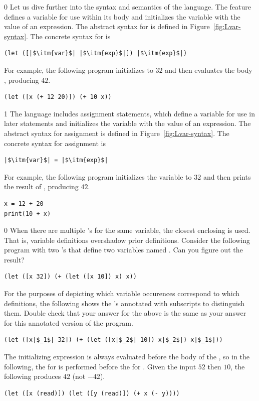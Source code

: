 \documentclass[7x10,nocrop]{TimesAPriori_MIT}%
\def\racketEd{0}
\def\pythonEd{1}
\def\edition{0}
\begin{document}
{\if\edition\racketEd
Let us dive further into the syntax and semantics of the \LangVar{}
language.  The  feature defines a variable for use within its
body and initializes the variable with the value of an expression.
The abstract syntax for  is defined in
Figure~\ref{fig:Lvar-syntax}.  The concrete syntax for  is
\begin{lstlisting}
(let ([|$\itm{var}$| |$\itm{exp}$|]) |$\itm{exp}$|)
\end{lstlisting}
For example, the following program initializes  to $32$ and then
evaluates the body , producing $42$.
\begin{lstlisting}
(let ([x (+ 12 20)]) (+ 10 x))
\end{lstlisting}
\fi}
%
{\if\edition\pythonEd
%
The \LangVar{} language includes assignment statements, which define a
variable for use in later statements and initializes the variable with
the value of an expression.  The abstract syntax for assignment is
defined in Figure~\ref{fig:Lvar-syntax}.  The concrete syntax for
assignment is
\begin{lstlisting}
|$\itm{var}$| = |$\itm{exp}$|
\end{lstlisting}
For example, the following program initializes the variable 
to $32$ and then prints the result of , producing $42$.
\begin{lstlisting}
x = 12 + 20
print(10 + x)
\end{lstlisting}
\fi}

{\if\edition\racketEd
%  
When there are multiple 's for the same variable, the closest
enclosing  is used. That is, variable definitions overshadow
prior definitions. Consider the following program with two 's
that define two variables named . Can you figure out the
result?
\begin{lstlisting}
(let ([x 32]) (+ (let ([x 10]) x) x))
\end{lstlisting}
For the purposes of depicting which variable occurences correspond to
which definitions, the following shows the 's annotated with
subscripts to distinguish them. Double check that your answer for the
above is the same as your answer for this annotated version of the
program.
\begin{lstlisting}
(let ([x|$_1$| 32]) (+ (let ([x|$_2$| 10]) x|$_2$|) x|$_1$|))
\end{lstlisting}
The initializing expression is always evaluated before the body of the
, so in the following, the  for  is
performed before the  for . Given the input
$52$ then $10$, the following produces $42$ (not $-42$).
\begin{lstlisting}
(let ([x (read)]) (let ([y (read)]) (+ x (- y))))
\end{lstlisting}
\fi}
\end{document}
